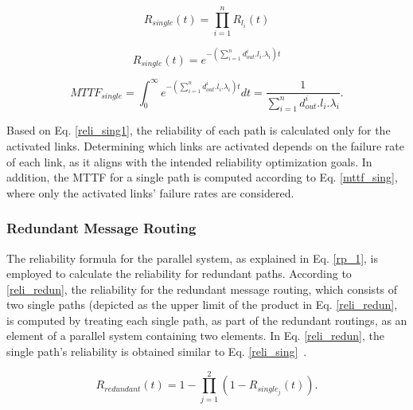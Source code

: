     
    \begin{equation}
        R_{single}(t) = \prod_{i=1}^n R_{l_i}(t)
    \label{reli_sing}
    \end{equation}
    
    \begin{equation}
        R_{single}(t) = e^{-(\sum_{i=1}^n d^{i}_{out}.l_i.\lambda_i) t}
            \label{reli_sing1}
    \end{equation}
    
        
    \begin{equation}
           MTTF_{single} = \int_0^{\infty} e^{-(\sum_{i=1}^n d^{i}_{out}.l_i.\lambda_i) t} dt = \frac{1}{\sum_{i=1}^n d^{i}_{out}.l_i.\lambda_i}.
               \label{mttf_sing}
    \end{equation}
    
    Based on Eq. \eqref{reli_sing1}, the reliability of each path is calculated only for the activated links. Determining which links are activated depends on the failure rate of each link, as it aligns with the intended reliability optimization goals. In addition, the MTTF for a single path is computed according to Eq. \eqref{mttf_sing}, where only the activated links' failure rates are considered.
    
    
    
    \subsubsection{Redundant Message Routing}
    The reliability formula for the parallel system, as explained in Eq. \eqref{rp_1}, is employed to calculate the reliability for redundant paths. According to \eqref{reli_redun}, the reliability for the redundant message routing, which consists of two single paths (depicted as the upper limit of the product in Eq. \eqref{reli_redun}, is computed by treating each single path, as part of the redundant routings, as an element of a parallel system containing two elements. In Eq. \eqref{reli_redun}, the single path's reliability is obtained similar to Eq. \eqref{reli_sing}~\cite{10588416}.
    
    \begin{equation}
     R_{redundant}(t) = 1 - \prod_{j=1}^2 (1 - R_{single_j}(t)).
     \label{reli_redun}
    \end{equation}
    
